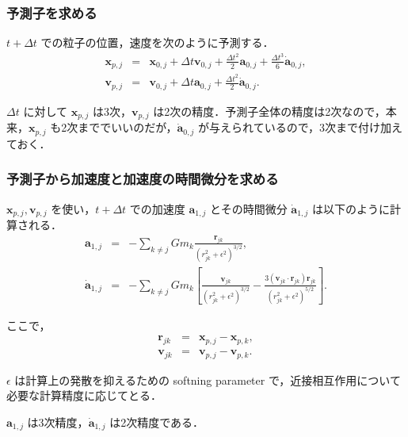 \documentclass[11pt,a4paper,oneside,onecolumn]{jarticle}
\begin{document}
\subsubsection{予測子を求める \label{sec:predictor}}
$t + \Delta t$ での粒子の位置，速度を次のように予測する．
\begin{eqnarray}
{\bm x}_{p,j} & = & {\bm x}_{0,j} + \Delta t {\bm v}_{0,j} + \frac{\Delta t ^2}{2} {\bm a}_{0,j} + \frac{\Delta t ^3}{6} \dot{{\bm a}}_{0,j}, \\
{\bm v}_{p,j} & = & {\bm v}_{0,j} + \Delta t {\bm a}_{0,j} + \frac{\Delta t ^2}{2} \dot{{\bm a}}_{0,j}. 
\end{eqnarray}

$\Delta t$ に対して ${\bm x}_{p,j}$ は3次，${\bm v}_{p,j}$ は2次の精度．予測子全体の精度は2次なので，本来，${\bm x}_{p,j}$ も2次まででいいのだが，$\dot{{\bm a}}_{0,j}$ が与えられているので，3次まで付け加えておく．

\subsubsection{予測子から加速度と加速度の時間微分を求める}
${\bm x}_{p,j}, {\bm v}_{p,j}$ を使い，$t + \Delta t$ での加速度 ${\bm a}_{1,j}$ とその時間微分 $\dot{{\bm a}}_{1,j}$ は以下のように計算される．
\begin{eqnarray}
{\bm a}_{1,j} & = & - \sum_{k \not= j} G m_k \frac{{\bm r}_{jk}}{(r_{jk}^2 + \epsilon^2)^{3/2}}, \label{eq:a1j}\\
\dot{{\bm a}}_{1,j} & = & - \sum_{k \not= j} G m_k \left[ \frac{{\bm v}_{jk}}{(r_{jk}^2 + \epsilon^2)^{3/2}} - \frac{3 ( {\bm v}_{jk} \cdot {\bm r}_{jk} ) {\bm r}_{jk} }{(r_{jk}^2 + \epsilon^2)^{5/2}} \right]. \label{eq:a2j}
\end{eqnarray}

ここで，
\begin{eqnarray}
{\bm r}_{jk} & = & {\bm x}_{p,j} - {\bm x}_{p,k}, \\
{\bm v}_{jk} & = & {\bm v}_{p,j} - {\bm v}_{p,k}. 
\end{eqnarray}

$\epsilon$ は計算上の発散を抑えるための softning parameter で，近接相互作用について必要な計算精度に応じてとる．

${\bm a}_{1,j}$ は3次精度，$\dot{{\bm a}}_{1,j}$ は2次精度である．
\end{document}
